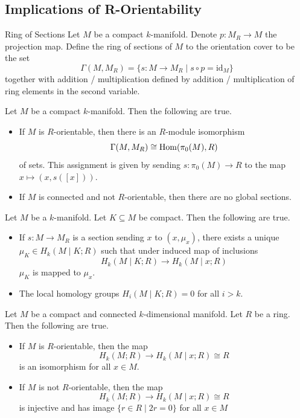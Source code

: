 \documentclass[a4paper]{article}
\begin{document}
\subsection{Implications of R-Orientability}
\begin{defn}{Ring of Sections}{} Let $M$ be a compact $k$-manifold. Denote $p:M_R\to M$ the projection map. Define the ring of sections of $M$ to the orientation cover to be the set $$\Gamma(M,M_R)=\{s:M\to M_R\;|\;s\circ p=\text{id}_M\}$$ together with addition / multiplication defined by addition / multiplication of ring elements in the second variable. 
\end{defn}

\begin{prp}{}{} Let $M$ be a compact $k$-manifold. Then the following are true. 
\begin{itemize}
\item If $M$ is $R$-orientable, then there is an $R$-module isomorphism $$\Gamma(M,M_R)\cong\operatorname{Hom}(\pi_0(M),R)$$ of sets. This assignment is given by sending $s:\pi_0(M)\to R$ to the map $x\mapsto(x,s([x]))$. 
\item If $M$ is connected and not $R$-orientable, then there are no global sections. 
\end{itemize}
\end{prp}

\begin{prp}{}{} Let $M$ be a $k$-manifold. Let $K\subseteq M$ be compact. Then the following are true. 
\begin{itemize}
\item If $s:M\to M_R$ is a section sending $x$ to $(x,\mu_x)$, there exists a unique $\mu_K\in H_k(M\;|\;K;R)$ such that under induced map of inclusions $$H_k(M\;|\;K;R)\to H_k(M\;|\;x;R)$$ $\mu_K$ is mapped to $\mu_x$. 
\item The local homology groups $H_i(M\;|\;K;R)=0$ for all $i>k$. 
\end{itemize}
\end{prp}

\begin{thm}{}{} Let $M$ be a compact and connected $k$-dimensional manifold. Let $R$ be a ring. Then the following are true. 
\begin{itemize}
\item If $M$ is $R$-orientable, then the map $$H_k(M;R)\to H_k(M\;|\;x;R)\cong R$$ is an isomorphism for all $x\in M$. 
\item If $M$ is not $R$-orientable, then the map $$H_k(M;R)\to H_k(M\;|\;x;R)\cong R$$ is injective and has image $\{r\in R\;|\;2r=0\}$ for all $x\in M$
\end{itemize}
\end{thm}
\end{document}
